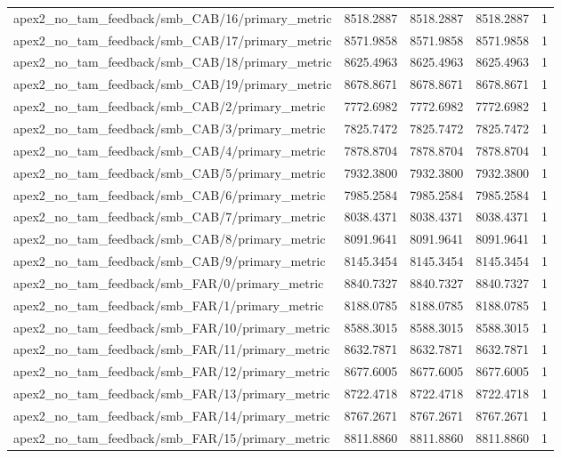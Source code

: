\begin{table}[h]
\begin{tabular}{lrrrr}
apex2_no_tam_feedback/smb_CAB/16/primary_metric & 8518.2887 & 8518.2887 & 8518.2887 & 1 \\
apex2_no_tam_feedback/smb_CAB/17/primary_metric & 8571.9858 & 8571.9858 & 8571.9858 & 1 \\
apex2_no_tam_feedback/smb_CAB/18/primary_metric & 8625.4963 & 8625.4963 & 8625.4963 & 1 \\
apex2_no_tam_feedback/smb_CAB/19/primary_metric & 8678.8671 & 8678.8671 & 8678.8671 & 1 \\
apex2_no_tam_feedback/smb_CAB/2/primary_metric & 7772.6982 & 7772.6982 & 7772.6982 & 1 \\
apex2_no_tam_feedback/smb_CAB/3/primary_metric & 7825.7472 & 7825.7472 & 7825.7472 & 1 \\
apex2_no_tam_feedback/smb_CAB/4/primary_metric & 7878.8704 & 7878.8704 & 7878.8704 & 1 \\
apex2_no_tam_feedback/smb_CAB/5/primary_metric & 7932.3800 & 7932.3800 & 7932.3800 & 1 \\
apex2_no_tam_feedback/smb_CAB/6/primary_metric & 7985.2584 & 7985.2584 & 7985.2584 & 1 \\
apex2_no_tam_feedback/smb_CAB/7/primary_metric & 8038.4371 & 8038.4371 & 8038.4371 & 1 \\
apex2_no_tam_feedback/smb_CAB/8/primary_metric & 8091.9641 & 8091.9641 & 8091.9641 & 1 \\
apex2_no_tam_feedback/smb_CAB/9/primary_metric & 8145.3454 & 8145.3454 & 8145.3454 & 1 \\
apex2_no_tam_feedback/smb_FAR/0/primary_metric & 8840.7327 & 8840.7327 & 8840.7327 & 1 \\
apex2_no_tam_feedback/smb_FAR/1/primary_metric & 8188.0785 & 8188.0785 & 8188.0785 & 1 \\
apex2_no_tam_feedback/smb_FAR/10/primary_metric & 8588.3015 & 8588.3015 & 8588.3015 & 1 \\
apex2_no_tam_feedback/smb_FAR/11/primary_metric & 8632.7871 & 8632.7871 & 8632.7871 & 1 \\
apex2_no_tam_feedback/smb_FAR/12/primary_metric & 8677.6005 & 8677.6005 & 8677.6005 & 1 \\
apex2_no_tam_feedback/smb_FAR/13/primary_metric & 8722.4718 & 8722.4718 & 8722.4718 & 1 \\
apex2_no_tam_feedback/smb_FAR/14/primary_metric & 8767.2671 & 8767.2671 & 8767.2671 & 1 \\
apex2_no_tam_feedback/smb_FAR/15/primary_metric & 8811.8860 & 8811.8860 & 8811.8860 & 1 \\

\end{tabular}
\end{table}
